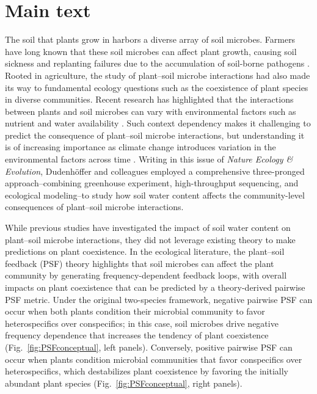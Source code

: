 \documentclass[hidelinks,letterpaper, 11pt]{article}
\begin{document}
\section*{Main text}
The soil that plants grow in harbors a diverse array of soil microbes.
Farmers have long known that these soil microbes can affect plant growth, causing soil sickness and replanting failures due to the accumulation of soil-borne pathogens \citep{Huang2013, Dias2015}. 
Rooted in agriculture, the study of plant--soil microbe interactions had also made its way to fundamental ecology questions such as the coexistence of plant species in diverse communities\citep{vanderPutten2013}. 
Recent research has highlighted that the interactions between plants and soil microbes can vary with environmental factors such as nutrient and water availability \citep{Smith2017, DeLong2019}.
Such context dependency makes it challenging to predict the consequence of plant--soil microbe interactions, but understanding it is of increasing importance as climate change introduces variation in the environmental factors across time \citep{Pugnaire2019}.
Writing in this issue of \textit{Nature Ecology \& Evolution}, Dudenh{\"o}ffer and colleagues \citep{Dudenhoffer2022} employed a comprehensive three-pronged approach--combining greenhouse experiment, high-throughput sequencing, and ecological modeling--to study how soil water content affects the community-level consequences of plant--soil microbe interactions. 
\medskip


While previous studies have investigated the impact of soil water content on plant--soil microbe interactions, they did not leverage existing theory to make predictions on plant coexistence.
In the ecological literature, the plant--soil feedback (PSF) theory \citep{Bever1997} highlights that soil microbes can affect the plant community by generating frequency-dependent feedback loops, with overall impacts on plant coexistence that can be predicted by a theory-derived pairwise PSF metric.
Under the original two-species framework, negative pairwise PSF can occur when both plants condition their microbial community to favor heterospecifics over conspecifics; in this case, soil microbes drive negative frequency dependence that increases the tendency of plant coexistence (Fig.~\ref{fig:PSFconceptual}, left panels). 
Conversely, positive pairwise PSF can occur when plants condition microbial communities that favor conspecifics over heterospecifics, which destabilizes plant coexistence by favoring the initially abundant plant species (Fig.~\ref{fig:PSFconceptual}, right panels).
\medskip 
\end{document}
